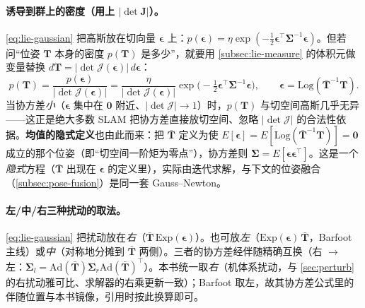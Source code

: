 \paragraph{诱导到群上的密度（用上 $|\det\mathbf{J}|$）。}\cref{eq:lie-gaussian} 把高斯放在切向量 $\boldsymbol{\epsilon}$ 上：$p(\boldsymbol{\epsilon})=\eta\exp(-\tfrac12\boldsymbol{\epsilon}^\top\boldsymbol{\Sigma}^{-1}\boldsymbol{\epsilon})$。但若问“位姿 $\mathbf{T}$ 本身的密度 $p(\mathbf{T})$ 是多少”，就要用 \cref{subsec:lie-measure} 的体积元做变量替换 $d\mathbf{T}=|\det\boldsymbol{\mathcal{J}}(\boldsymbol{\epsilon})|\,d\boldsymbol{\epsilon}$：
\begin{equation}
  p(\mathbf{T})=\frac{p(\boldsymbol{\epsilon})}{|\det\boldsymbol{\mathcal{J}}(\boldsymbol{\epsilon})|}
  =\frac{\eta}{|\det\boldsymbol{\mathcal{J}}(\boldsymbol{\epsilon})|}\exp\!\Big(-\tfrac12\boldsymbol{\epsilon}^\top\boldsymbol{\Sigma}^{-1}\boldsymbol{\epsilon}\Big),\qquad
  \boldsymbol{\epsilon}=\mathrm{Log}(\bar{\mathbf{T}}^{-1}\mathbf{T}).
  \label{eq:induced-density}
\end{equation}
当协方差\emph{小}（$\boldsymbol{\epsilon}$ 集中在 $\mathbf{0}$ 附近、$|\det\boldsymbol{\mathcal{J}}|\to1$）时，$p(\mathbf{T})$ 与切空间高斯几乎无异——这正是绝大多数 SLAM 把协方差直接放切空间、忽略 $|\det\boldsymbol{\mathcal{J}}|$ 的合法性依据。\textbf{均值的隐式定义}也由此而来：把 $\bar{\mathbf{T}}$ 定义为使 $E[\boldsymbol{\epsilon}]=E[\mathrm{Log}(\bar{\mathbf{T}}^{-1}\mathbf{T})]=\mathbf{0}$ 成立的那个位姿（即“切空间一阶矩为零点”），协方差则 $\boldsymbol{\Sigma}=E[\boldsymbol{\epsilon}\boldsymbol{\epsilon}^\top]$。这是一个\emph{隐式}方程（$\bar{\mathbf{T}}$ 出现在 $\boldsymbol{\epsilon}$ 的定义里），实际由迭代求解，与下文的位姿融合（\cref{subsec:pose-fusion}）是同一套 Gauss--Newton。

\paragraph{左/中/右三种扰动的取法。}\cref{eq:lie-gaussian} 把扰动放在\emph{右}（$\bar{\mathbf{T}}\,\mathrm{Exp}(\boldsymbol{\epsilon})$）。也可放\emph{左}（$\mathrm{Exp}(\boldsymbol{\epsilon})\,\bar{\mathbf{T}}$，Barfoot 主线）或\emph{中}（对称地分摊到 $\bar{\mathbf{T}}$ 两侧）。三者的协方差经伴随精确互换（右 $\to$ 左：$\boldsymbol{\Sigma}_l=\mathrm{Ad}(\bar{\mathbf{T}})\boldsymbol{\Sigma}_r\mathrm{Ad}(\bar{\mathbf{T}})^\top$）。本书统一取\emph{右}（机体系扰动，与 \cref{sec:perturb} 的右扰动雅可比、求解器的右乘更新一致）；Barfoot 取左，故其协方差公式里的伴随位置与本书镜像，引用时按此换算即可。

